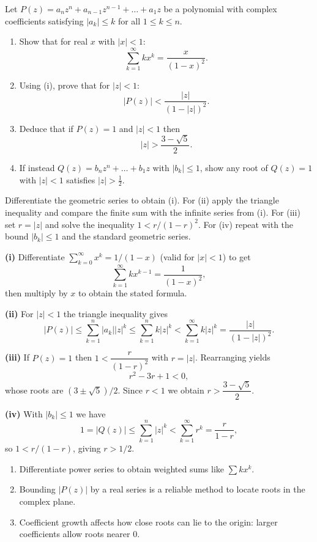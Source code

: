 
\begin{problem}
Let \(P(z)=a_n z^n + a_{n-1} z^{n-1}+\dots+a_1 z\) be a polynomial with complex coefficients satisfying
\(|a_k|\le k\) for all $1\le k\le n$.

\begin{enumerate}[label=(\roman*)]
    \item Show that for real $x$ with $|x|<1$:
    \[\sum_{k=1}^\infty k x^k = \frac{x}{(1-x)^2}.
    \]
    \item Using (i), prove that for $|z|<1$:
    \[|P(z)| < \frac{|z|}{(1-|z|)^2}.
    \]
    \item Deduce that if $P(z)=1$ and $|z|<1$ then
    \[|z|>\frac{3-\sqrt{5}}{2}.
    \]
    \item If instead $Q(z)=b_n z^n+\dots+b_1 z$ with $|b_k|\le1$, show any root of $Q(z)=1$ with $|z|<1$ satisfies $|z|>\tfrac12$.
\end{enumerate}
\end{problem}

\begin{hint}
Differentiate the geometric series to obtain (i). For (ii) apply the triangle inequality and compare the finite sum with the infinite series from (i). For (iii) set $r=|z|$ and solve the inequality $1<r/(1-r)^2$. For (iv) repeat with the bound $|b_k|\le1$ and the standard geometric series.
\end{hint}

\begin{solution}
	\textbf{(i)} Differentiate $\sum_{k=0}^\infty x^k=1/(1-x)$ (valid for $|x|<1$) to get
\[\sum_{k=1}^\infty k x^{k-1}=\frac{1}{(1-x)^2},\]
then multiply by $x$ to obtain the stated formula.

	\textbf{(ii)} For $|z|<1$ the triangle inequality gives
\[|P(z)|\le\sum_{k=1}^n |a_k||z|^k\le\sum_{k=1}^n k|z|^k<\sum_{k=1}^\infty k|z|^k=\frac{|z|}{(1-|z|)^2}.
\]

	\textbf{(iii)} If $P(z)=1$ then $1<\dfrac{r}{(1-r)^2}$ with $r=|z|$. Rearranging yields
\[r^2-3r+1<0,
\]
whose roots are $(3\pm\sqrt{5})/2$. Since $r<1$ we obtain $r>\dfrac{3-\sqrt{5}}{2}$.

	\textbf{(iv)} With $|b_k|\le1$ we have
\[1=|Q(z)|\le\sum_{k=1}^n |z|^k<\sum_{k=1}^\infty r^k=\frac{r}{1-r},
\]
so $1<r/(1-r)$, giving $r>1/2$.
\end{solution}

\begin{takeaways}
\begin{enumerate}
    \item Differentiate power series to obtain weighted sums like $\sum kx^k$.
    \item Bounding $|P(z)|$ by a real series is a reliable method to locate roots in the complex plane.
    \item Coefficient growth affects how close roots can lie to the origin: larger coefficients allow roots nearer $0$.
\end{enumerate}
\end{takeaways}

